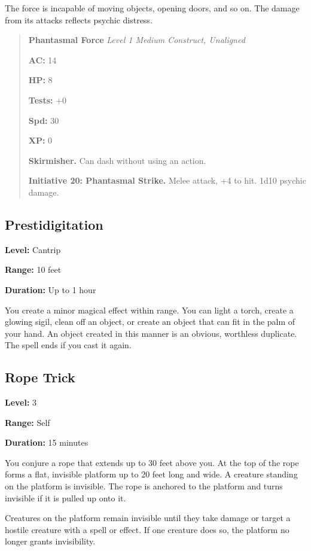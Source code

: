 \documentclass[12pt,letterpaper,twocolumn,openany,nodeprecatedcode,bg=none]{dndbook}
\let\oldsubsection\subsection
\renewcommand{\subsection}[1]{%
  \needspace{5\baselineskip}%
  \oldsubsection{#1}%
}
\begin{document}
The force is incapable of moving objects, opening doors, and so on. The
damage from its attacks reflects psychic distress.

\begin{quote}
\textbf{Phantasmal Force} \emph{Level 1 Medium Construct, Unaligned}

\textbf{AC:} 14

\textbf{HP:} 8

\textbf{Tests:} +0

\textbf{Spd:} 30

\textbf{XP:} 0

\textbf{Skirmisher.} Can dash without using an action.

\textbf{Initiative 20: Phantasmal Strike.} Melee attack, +4 to hit. 1d10
psychic damage.
\end{quote}

\subsection{Prestidigitation}\label{prestidigitation}

\textbf{Level:} Cantrip

\textbf{Range:} 10 feet

\textbf{Duration:} Up to 1 hour

You create a minor magical effect within range. You can light a torch,
create a glowing sigil, clean off an object, or create an object that
can fit in the palm of your hand. An object created in this manner is an
obvious, worthless duplicate. The spell ends if you cast it again.

\subsection{Rope Trick}\label{rope-trick}

\textbf{Level:} 3

\textbf{Range:} Self

\textbf{Duration:} 15 minutes

You conjure a rope that extends up to 30 feet above you. At the top of
the rope forms a flat, invisible platform up to 20 feet long and wide. A
creature standing on the platform is invisible. The rope is anchored to
the platform and turns invisible if it is pulled up onto it.

Creatures on the platform remain invisible until they take damage or
target a hostile creature with a spell or effect. If one creature does
so, the platform no longer grants invisibility.
\end{document}
